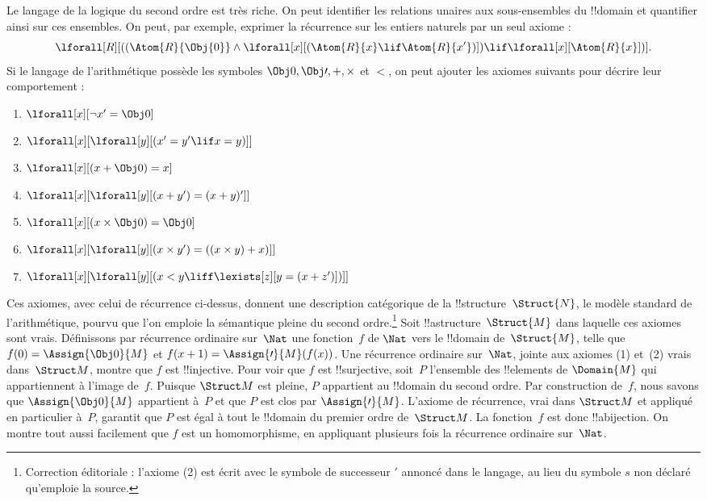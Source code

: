 \documentclass[../../../include/open-logic-section]{subfiles}
\begin{document}
Le langage de la logique du second ordre est très riche. On peut
identifier les relations unaires aux sous-ensembles du !!{domain} et
quantifier ainsi sur ces ensembles. On peut, par exemple, exprimer
la récurrence sur les entiers naturels par un seul axiome :
\[
\lforall[R][((\Atom{R}{\Obj{0}} \land \lforall[x][(\Atom{R}{x} \lif
    \Atom{R}{x'})]) \lif \lforall[x][\Atom{R}{x}])].
\]
Si le langage de l'arithmétique possède les symboles $\Obj 0, \Obj \prime, +,
\times$ et $<$, on peut ajouter les axiomes suivants pour décrire
leur comportement :
\begin{enumerate}
\item $\lforall[x][\lnot x' = \Obj 0]$
\item $\lforall[x][\lforall[y][(x' = y' \lif x = y)]]$
\item $\lforall[x][(x + \Obj 0) = x]$
\item $\lforall[x][\lforall[y][(x + y') = (x + y)']]$
\item $\lforall[x][(x \times \Obj 0) = \Obj 0]$
\item $\lforall[x][\lforall[y][(x \times y') = ((x \times y) + x)]]$
\item $\lforall[x][\lforall[y][(x < y \liff \lexists[z][y = (x + z')])]]$
\end{enumerate}
Ces axiomes, avec celui de récurrence ci-dessus, donnent une
description catégorique de la !!{structure}~$\Struct{N}$, le
modèle standard de l'arithmétique, pourvu que l'on emploie la
sémantique pleine du second ordre.\footnote{Correction éditoriale : l'axiome (2) est écrit avec le symbole de successeur $\prime$ annoncé dans le langage, au lieu du symbole $s$ non déclaré qu'emploie la source.} Soit !!a{structure}~$\Struct{M}$
dans laquelle ces axiomes sont vrais. Définissons par récurrence
ordinaire sur~$\Nat$ une fonction~$f$ de $\Nat$ vers le !!{domain}
de~$\Struct{M}$, telle que $f(0) = \Assign{\Obj 0}{M}$ et
$f(x+1) = \Assign{\prime}{M}(f(x))$. Une récurrence ordinaire
sur~$\Nat$, jointe aux axiomes (1) et~(2) vrais dans~$\Struct M$,
montre que $f$ est !!{injective}. Pour voir que $f$ est
!!{surjective}, soit~$P$ l'ensemble des !!{element}s de
$\Domain{M}$ qui appartiennent à l'image de~$f$. Puisque
$\Struct M$ est pleine, $P$ appartient au !!{domain} du second
ordre. Par construction de~$f$, nous savons que $\Assign{\Obj
  0}{M}$ appartient à~$P$ et que $P$ est clos par
$\Assign{\prime}{M}$. L'axiome de récurrence, vrai dans
$\Struct M$ et appliqué en particulier à~$P$, garantit que
$P$ est égal à tout le !!{domain} du premier ordre de~$\Struct M$.
La fonction~$f$ est donc !!a{bijection}. On montre tout aussi
facilement que $f$ est un homomorphisme, en appliquant plusieurs fois
la récurrence ordinaire sur~$\Nat$.
\end{document}
